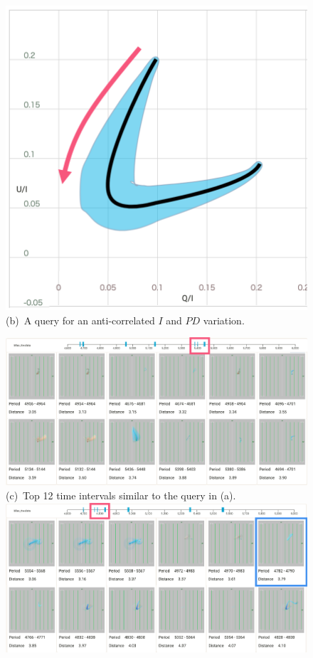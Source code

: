 \begin{figure}[tb]
\begin{minipage}{0.49\linewidth}
        \includegraphics[width=.9\linewidth]{vgtc_journal_latex/figures/QBSanticorrelate.png}\\
        \footnotesize{\sf(b)~A query for an anti-correlated $I$ and $PD$ variation.}\\
    \end{minipage}
    \includegraphics[width=.99\linewidth]{vgtc_journal_latex/figures/correlateResultsLabel14.png}\\
    \footnotesize{\sf(c)~Top 12 time intervals similar to the query in (a).}\\
    \includegraphics[width=.99\linewidth]{vgtc_journal_latex/figures/anticorrelateResultsLabel14.png}\\

\end{figure}
